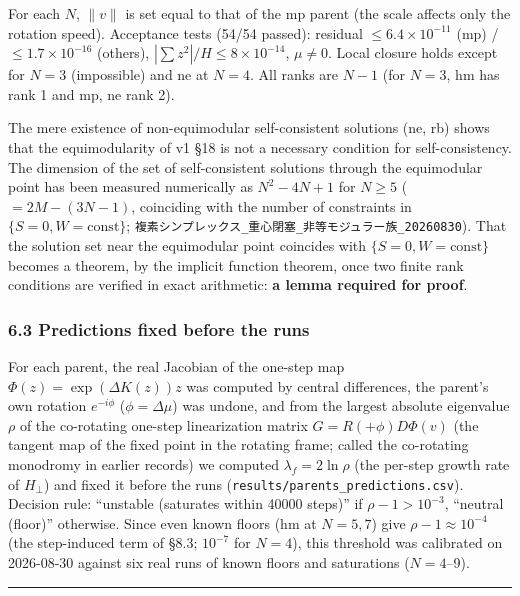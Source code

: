 \documentclass[
  10pt,
  a4paper,
]{article}
\begin{document}
For each \(N\), \(\|v\|\) is set equal to that of the mp parent (the
scale affects only the rotation speed). Acceptance tests (54/54 passed):
residual \(\le6.4\times10^{-11}\) (mp) / \(\le1.7\times10^{-16}\)
(others), \(|\sum z^2|/H\le8\times10^{-14}\), \(\mu\ne0\). Local closure
holds except for \(N=3\) (impossible) and ne at \(N=4\). All ranks are
\(N-1\) (for \(N=3\), hm has rank 1 and mp, ne rank 2).

The mere existence of non-equimodular self-consistent solutions (ne, rb)
shows that the equimodularity of v1 §18 is not a necessary condition for
self-consistency. The dimension of the set of self-consistent solutions
through the equimodular point has been measured numerically as
\(N^2-4N+1\) for \(N\ge5\) (\(=2M-(3N-1)\), coinciding with the number
of constraints in \(\{S=0,W=\text{const}\}\);
\texttt{複素シンプレックス\_重心閉塞\_非等モジュラー族\_20260830}). That
the solution set near the equimodular point coincides with
\(\{S=0,W=\text{const}\}\) becomes a theorem, by the implicit function
theorem, once two finite rank conditions are verified in exact
arithmetic: \textbf{a lemma required for proof}.

\subsubsection{6.3 Predictions fixed before the
runs}\label{predictions-fixed-before-the-runs}

For each parent, the real Jacobian of the one-step map
\(\Phi(z)=\exp(\Delta K(z))z\) was computed by central differences, the
parent's own rotation \(e^{-i\phi}\) (\(\phi=\Delta\mu\)) was undone,
and from the largest absolute eigenvalue \(\rho\) of the co-rotating
one-step linearization matrix \(G=R(+\phi)D\Phi(v)\) (the tangent map of
the fixed point in the rotating frame; called the co-rotating monodromy
in earlier records) we computed \(\lambda_f=2\ln\rho\) (the per-step
growth rate of \(H_\perp\)) and fixed it before the runs
(\texttt{results/parents\_predictions.csv}). Decision rule: ``unstable
(saturates within 40000 steps)'' if \(\rho-1>10^{-3}\), ``neutral
(floor)'' otherwise. Since even known floors (hm at \(N=5,7\)) give
\(\rho-1\approx10^{-4}\) (the step-induced term of §8.3; \(10^{-7}\) for
\(N=4\)), this threshold was calibrated on 2026-08-30 against six real
runs of known floors and saturations (\(N=4\)--9).

\begin{center}\rule{0.5\linewidth}{0.5pt}\end{center}
\end{document}
